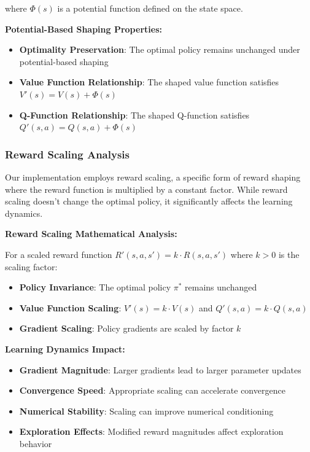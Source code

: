 \documentclass[12pt]{article}
\begin{document}
{{{where $\Phi(s)$ is a potential function defined on the state space.

\textbf{Potential-Based Shaping Properties:}
\begin{itemize}
    \item \textbf{Optimality Preservation}: The optimal policy remains unchanged under potential-based shaping
    \item \textbf{Value Function Relationship}: The shaped value function satisfies $V'(s) = V(s) + \Phi(s)$
    \item \textbf{Q-Function Relationship}: The shaped Q-function satisfies $Q'(s,a) = Q(s,a) + \Phi(s)$
\end{itemize}

\subsubsection{Reward Scaling Analysis}

Our implementation employs reward scaling, a specific form of reward shaping where the reward function is multiplied by a constant factor. While reward scaling doesn't change the optimal policy, it significantly affects the learning dynamics.

\textbf{Reward Scaling Mathematical Analysis:}

For a scaled reward function $R'(s,a,s') = k \cdot R(s,a,s')$ where $k > 0$ is the scaling factor:

\begin{itemize}
    \item \textbf{Policy Invariance}: The optimal policy $\pi^*$ remains unchanged
    \item \textbf{Value Function Scaling}: $V'(s) = k \cdot V(s)$ and $Q'(s,a) = k \cdot Q(s,a)$
    \item \textbf{Gradient Scaling}: Policy gradients are scaled by factor $k$
\end{itemize}

\textbf{Learning Dynamics Impact:}
\begin{itemize}
    \item \textbf{Gradient Magnitude}: Larger gradients lead to larger parameter updates
    \item \textbf{Convergence Speed}: Appropriate scaling can accelerate convergence
    \item \textbf{Numerical Stability}: Scaling can improve numerical conditioning
    \item \textbf{Exploration Effects}: Modified reward magnitudes affect exploration behavior
\end{itemize}

}}}
\end{document}
